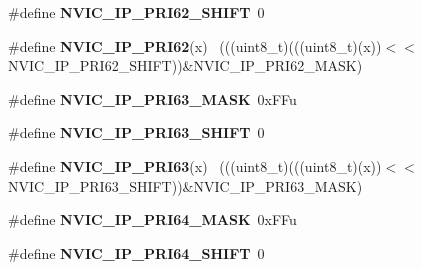 \begin{DoxyCompactItemize}
\item 
\hypertarget{group___n_v_i_c___register___masks_ga5b6a58c994e748a59e6393a2a7a6c6bb}{}\#define {\bfseries N\+V\+I\+C\+\_\+\+I\+P\+\_\+\+P\+R\+I62\+\_\+\+S\+H\+I\+F\+T}~0\label{group___n_v_i_c___register___masks_ga5b6a58c994e748a59e6393a2a7a6c6bb}

\item 
\hypertarget{group___n_v_i_c___register___masks_gaf6905cb50552221f7d4e66f1b566e0a9}{}\#define {\bfseries N\+V\+I\+C\+\_\+\+I\+P\+\_\+\+P\+R\+I62}(x)                                              ~(((uint8\+\_\+t)(((uint8\+\_\+t)(x))$<$$<$N\+V\+I\+C\+\_\+\+I\+P\+\_\+\+P\+R\+I62\+\_\+\+S\+H\+I\+F\+T))\&N\+V\+I\+C\+\_\+\+I\+P\+\_\+\+P\+R\+I62\+\_\+\+M\+A\+S\+K)\label{group___n_v_i_c___register___masks_gaf6905cb50552221f7d4e66f1b566e0a9}

\item 
\hypertarget{group___n_v_i_c___register___masks_ga4e7a88df7e2b6239fd5b28fe46c59f21}{}\#define {\bfseries N\+V\+I\+C\+\_\+\+I\+P\+\_\+\+P\+R\+I63\+\_\+\+M\+A\+S\+K}~0x\+F\+Fu\label{group___n_v_i_c___register___masks_ga4e7a88df7e2b6239fd5b28fe46c59f21}

\item 
\hypertarget{group___n_v_i_c___register___masks_ga0efbe774c41923b5d7859734e51dbbcf}{}\#define {\bfseries N\+V\+I\+C\+\_\+\+I\+P\+\_\+\+P\+R\+I63\+\_\+\+S\+H\+I\+F\+T}~0\label{group___n_v_i_c___register___masks_ga0efbe774c41923b5d7859734e51dbbcf}

\item 
\hypertarget{group___n_v_i_c___register___masks_gaaedcdb8c5aa1b4b8862f50fe4bbdd109}{}\#define {\bfseries N\+V\+I\+C\+\_\+\+I\+P\+\_\+\+P\+R\+I63}(x)                                              ~(((uint8\+\_\+t)(((uint8\+\_\+t)(x))$<$$<$N\+V\+I\+C\+\_\+\+I\+P\+\_\+\+P\+R\+I63\+\_\+\+S\+H\+I\+F\+T))\&N\+V\+I\+C\+\_\+\+I\+P\+\_\+\+P\+R\+I63\+\_\+\+M\+A\+S\+K)\label{group___n_v_i_c___register___masks_gaaedcdb8c5aa1b4b8862f50fe4bbdd109}

\item 
\hypertarget{group___n_v_i_c___register___masks_gaf0e5e8911cd7aeef322b905fd9aa7a72}{}\#define {\bfseries N\+V\+I\+C\+\_\+\+I\+P\+\_\+\+P\+R\+I64\+\_\+\+M\+A\+S\+K}~0x\+F\+Fu\label{group___n_v_i_c___register___masks_gaf0e5e8911cd7aeef322b905fd9aa7a72}

\item 
\hypertarget{group___n_v_i_c___register___masks_ga1b911f730f5ec0e3defd2d90c88fda7f}{}\#define {\bfseries N\+V\+I\+C\+\_\+\+I\+P\+\_\+\+P\+R\+I64\+\_\+\+S\+H\+I\+F\+T}~0\label{group___n_v_i_c___register___masks_ga1b911f730f5ec0e3defd2d90c88fda7f}


\end{DoxyCompactItemize}
